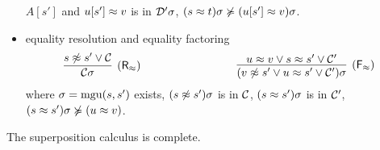 \begin{definition}
\begin{itemize}
		\( A[s'] \) and \( u[s']\approx v \) is \txtSTRICTLY{} in \( \mathcal{D}'\sigma \),
		\( (s\approx t)\sigma\not\succcurlyeq(u[s']\approx v)\sigma \).
		\item
		equality resolution and equality factoring
		\[
		\infer
		[\mathsf{(R_\mEQ)}]
		{\mcC\sigma}
		{{s\mNE s'}\lor\mcC}
		\hspace{3cm}
		\infer
		[\mathsf{(F_\mEQ)}]
		{(v\mNE s'\lor u\mEQ s'\lor\mcC')\sigma}
		{{ u\mEQ v}\lor{s\mEQ s'}\lor\mcC'}
		\]
		where
		\( \sigma=\operatorname{mgu}(s,s') \) exists,
		\( (s\not\approx s')\sigma \) is \txtMAXIMAL{} in \( \mathcal{C} \),
		\( (s\approx s')\sigma \) is \txtSTRICTLY{} in \( \mathcal{C}' \),
		\( (s\approx s')\sigma\not\succcurlyeq(u\approx v) \).
	\end{itemize}
\end{definition}

\begin{lemma}The superposition calculus is complete.\end{lemma}

